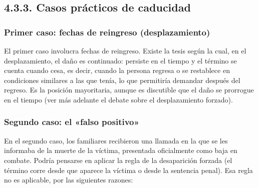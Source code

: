 \subsection{4.3.3. Casos prácticos de caducidad}
\subsubsection{Primer caso: fechas de reingreso (desplazamiento)}
El primer caso involucra fechas de reingreso. Existe la tesis según la cual, en el desplazamiento, el daño es continuado: persiste en el tiempo y el término se cuenta cuando cesa, es decir, cuando la persona regresa o se restablece en condiciones similares a las que tenía, lo que permitiría demandar después del regreso. Es la posición mayoritaria, aunque es discutible que el daño se prorrogue en el tiempo (ver más adelante el debate sobre el desplazamiento forzado).

\subsubsection{Segundo caso: el «falso positivo»}
En el segundo caso, los familiares recibieron una llamada en la que se les informaba de la muerte de la víctima, presentada oficialmente como baja en combate. Podría pensarse en aplicar la regla de la desaparición forzada (el término corre desde que aparece la víctima o desde la sentencia penal). Esa regla no es aplicable, por las siguientes razones:

